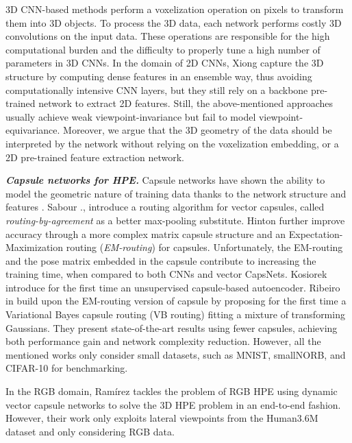 \documentclass[10pt,twocolumn,letterpaper]{article}
\begin{document}
3D CNN-based methods \cite{haque2016towards,moon2018v2v} perform a voxelization operation on pixels to transform them into 3D objects. To process the 3D data, each network performs costly 3D convolutions on the input data. These operations are responsible for the high computational burden and the difficulty to properly tune a high number of parameters in 3D CNNs.
In the domain of 2D CNNs, Xiong \etal\cite{xiong2019a2j} capture the 3D structure by computing dense features in an ensemble way, thus avoiding computationally intensive CNN layers, but they still rely on a backbone pre-trained network to extract 2D features.
Still, the above-mentioned approaches usually achieve weak viewpoint-invariance but fail to model viewpoint-equivariance. 
Moreover, we argue that the 3D geometry of the data should be interpreted by the network without relying on the voxelization embedding, or a 2D pre-trained feature extraction network. 


\textit{\textbf{Capsule networks for HPE.}} Capsule networks have shown the ability to model the geometric nature of training data thanks to the network structure and features \cite{sabour2017dynamic, hinton2018matrix, kosiorek2019stacked}.
Sabour \etal., introduce a routing algorithm for vector capsules, called \textit{routing-by-agreement} as a better max-pooling substitute.
Hinton \etal \cite{hinton2018matrix} further improve accuracy through a more complex matrix capsule structure and an Expectation-Maximization routing (\textit{EM-routing}) for capsules. Unfortunately, the EM-routing and the  pose matrix embedded in the capsule contribute to increasing the training time, when compared to both CNNs and vector CapsNets. 
Kosiorek \etal \cite{kosiorek2019stacked} introduce for the first time an unsupervised capsule-based autoencoder. Ribeiro \etal in \cite{ribeiro2020capsule} build upon the EM-routing version of capsule by proposing for the first time a Variational Bayes capsule routing (VB routing) fitting a mixture of transforming Gaussians. They present state-of-the-art results using  fewer capsules, achieving both performance gain and network complexity reduction. However, all the mentioned works only consider small datasets, such as MNIST, smallNORB, and CIFAR-10 for benchmarking. 

In the RGB domain, Ramírez \cite{ramirez2020bayesian} tackles the problem of RGB HPE using dynamic vector capsule networks \cite{sabour2017dynamic} to solve the 3D HPE problem in an end-to-end fashion. However, their work only exploits lateral viewpoints from the Human3.6M dataset and only considering RGB data.
\end{document}
